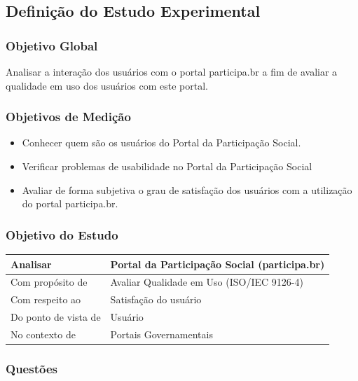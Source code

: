 \subsection{Definição do Estudo Experimental}

\subsubsection{Objetivo Global}

	Analisar a interação dos usuários com o portal participa.br a fim de avaliar a qualidade em uso dos usuários com este portal. 

\subsubsection{Objetivos de Medição}

\begin{itemize}
\item Conhecer quem são os usuários do Portal da Participação Social.
\item Verificar problemas de usabilidade no Portal da Participação Social
\item Avaliar de forma subjetiva o grau de satisfação dos usuários com a utilização do portal participa.br. 
\end{itemize}


\subsubsection{Objetivo do Estudo}


\begin{table}[h]
\begin{tabular}{|l|l|}
\hline
Analisar             & Portal da Participação Social (participa.br) \\ \hline
Com propósito de     & Avaliar Qualidade em Uso (ISO/IEC 9126-4)    \\ \hline
Com respeito ao      & Satisfação do usuário                        \\ \hline
Do ponto de vista de & Usuário                                      \\ \hline
No contexto de       & Portais Governamentais                       \\ \hline
\end{tabular}
\end{table}

\subsubsection{Questões}

